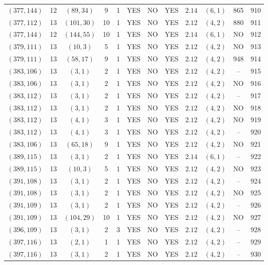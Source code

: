 \begin{longtable}{|c|c|c|c|c|c|c|c|c|c|c|c|}
$(377,144)$ & 12 & $(89,34)$ & 9 & 1 & YES & NO & YES & $2.14$ & $(6,1)$ & 865 & 910\\
$(377,112)$ & 13 & $(101,30)$ & 10 & 1 & YES & NO & YES & $2.12$ & $(4,2)$ & 880 & 911\\
$(377,144)$ & 12 & $(144,55)$ & 10 & 1 & YES & NO & YES & $2.14$ & $(6,1)$ & NO & 912\\
$(379,111)$ & 13 & $(10,3)$ & 5 & 1 & YES & NO & YES & $2.12$ & $(4,2)$ & NO & 913\\
$(379,111)$ & 13 & $(58,17)$ & 9 & 1 & YES & NO & YES & $2.12$ & $(4,2)$ & 948 & 914\\
$(383,106)$ & 13 & $(3,1)$ & 2 & 1 & YES & NO & YES & $2.12$ & $(4,2)$ & -- & 915\\
$(383,106)$ & 13 & $(3,1)$ & 2 & 1 & YES & NO & YES & $2.12$ & $(4,2)$ & NO & 916\\
$(383,112)$ & 13 & $(3,1)$ & 2 & 1 & YES & NO & YES & $2.12$ & $(4,2)$ & -- & 917\\
$(383,112)$ & 13 & $(3,1)$ & 2 & 1 & YES & NO & YES & $2.12$ & $(4,2)$ & NO & 918\\
$(383,112)$ & 13 & $(4,1)$ & 3 & 1 & YES & NO & YES & $2.12$ & $(4,2)$ & NO & 919\\
$(383,112)$ & 13 & $(4,1)$ & 3 & 1 & YES & NO & YES & $2.12$ & $(4,2)$ & -- & 920\\
$(383,106)$ & 13 & $(65,18)$ & 9 & 1 & YES & NO & YES & $2.12$ & $(4,2)$ & NO & 921\\
$(389,115)$ & 13 & $(3,1)$ & 2 & 1 & YES & NO & YES & $2.14$ & $(6,1)$ & -- & 922\\
$(389,115)$ & 13 & $(10,3)$ & 5 & 1 & YES & NO & YES & $2.12$ & $(4,2)$ & NO & 923\\
$(391,108)$ & 13 & $(3,1)$ & 2 & 1 & YES & NO & YES & $2.12$ & $(4,2)$ & -- & 924\\
$(391,108)$ & 13 & $(3,1)$ & 2 & 1 & YES & NO & YES & $2.12$ & $(4,2)$ & NO & 925\\
$(391,109)$ & 13 & $(3,1)$ & 2 & 1 & YES & NO & YES & $2.12$ & $(4,2)$ & -- & 926\\
$(391,109)$ & 13 & $(104,29)$ & 10 & 1 & YES & NO & YES & $2.12$ & $(4,2)$ & NO & 927\\
$(396,109)$ & 13 & $(3,1)$ & 2 & 3 & YES & NO & YES & $2.12$ & $(4,2)$ & -- & 928\\
$(397,116)$ & 13 & $(2,1)$ & 1 & 1 & YES & NO & YES & $2.12$ & $(4,2)$ & -- & 929\\
$(397,116)$ & 13 & $(3,1)$ & 2 & 1 & YES & NO & YES & $2.12$ & $(4,2)$ & -- & 930\\

\end{longtable}
